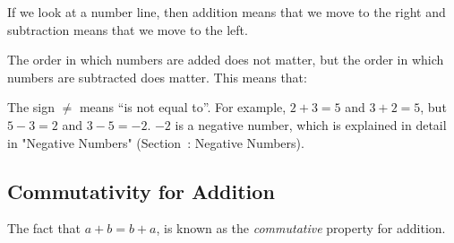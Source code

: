       \label{m38346*id172463}If we look at a number line, then addition means that we move to the right and subtraction means that we move to the left.\par 
      \label{m38346*id172468}The order in which numbers are added does not matter, but the order in which numbers are subtracted does matter. This means that:\par 
      \label{m38346*uid7}\nopagebreak\noindent{}
      \label{m38346*id172553}The sign $\ne $ means ``is not equal to''. For example, $2+3=5$ and $3+2=5$, but $5-3=2$ and $3-5=-2$. $-2$ is a negative number, which is explained in detail in "Negative Numbers" (Section~: Negative Numbers).\par 
\label{m38346*secfhsst!!!underscore!!!id341}
            \subsection{  Commutativity for Addition }
            \nopagebreak
      \label{m38346*id172661}The fact that $a+b=b+a$, is known as the
\textsl{commutative} property for addition. \par 
